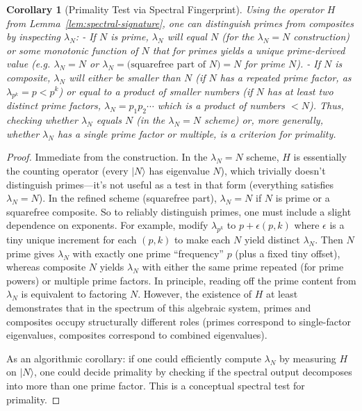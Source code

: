 \documentclass[11pt]{article}
\newtheorem{corollary}{Corollary}
\begin{document}
{\begin{corollary}[Primality Test via Spectral Fingerprint]\label{cor:spectral-prime}
Using the operator $H$ from Lemma~\ref{lem:spectral-signature}, one can distinguish primes from composites by inspecting $\lambda_N$:
- If $N$ is prime, $\lambda_N$ will equal $N$ (for the $\lambda_N=N$ construction) or some monotonic function of $N$ that for primes yields a unique prime-derived value (e.g. $\lambda_N = N$ or $\lambda_N = \text{(squarefree part of $N$)} = N$ for prime $N$).
- If $N$ is composite, $\lambda_N$ will either be smaller than $N$ (if $N$ has a repeated prime factor, as $\lambda_{p^k}=p < p^k$) or equal to a product of smaller numbers (if $N$ has at least two distinct prime factors, $\lambda_N = p_1 p_2 \cdots$ which is a product of numbers $<N$).
Thus, checking whether $\lambda_N$ equals $N$ (in the $\lambda_N=N$ scheme) or, more generally, whether $\lambda_N$ has a single prime factor or multiple, is a criterion for primality.
\end{corollary}

\begin{proof}
Immediate from the construction. In the $\lambda_N = N$ scheme, $H$ is essentially the counting operator (every $|N\rangle$ has eigenvalue $N$), which trivially doesn’t distinguish primes—it’s not useful as a test in that form (everything satisfies $\lambda_N = N$). In the refined scheme (squarefree part), $\lambda_N = N$ if $N$ is prime or a squarefree composite. So to reliably distinguish primes, one must include a slight dependence on exponents. For example, modify $\lambda_{p^k}$ to $p + \epsilon(p,k)$ where $\epsilon$ is a tiny unique increment for each $(p,k)$ to make each $N$ yield distinct $\lambda_N$. Then $N$ prime gives $\lambda_N$ with exactly one prime “frequency” $p$ (plus a fixed tiny offset), whereas composite $N$ yields $\lambda_N$ with either the same prime repeated (for prime powers) or multiple prime factors. In principle, reading off the prime content from $\lambda_N$ is equivalent to factoring $N$. However, the existence of $H$ at least demonstrates that in the spectrum of this algebraic system, primes and composites occupy structurally different roles (primes correspond to single-factor eigenvalues, composites correspond to combined eigenvalues).

As an algorithmic corollary: if one could efficiently compute $\lambda_N$ by measuring $H$ on $|N\rangle$, one could decide primality by checking if the spectral output decomposes into more than one prime factor. This is a conceptual spectral test for primality.
\end{proof}

}
\end{document}
